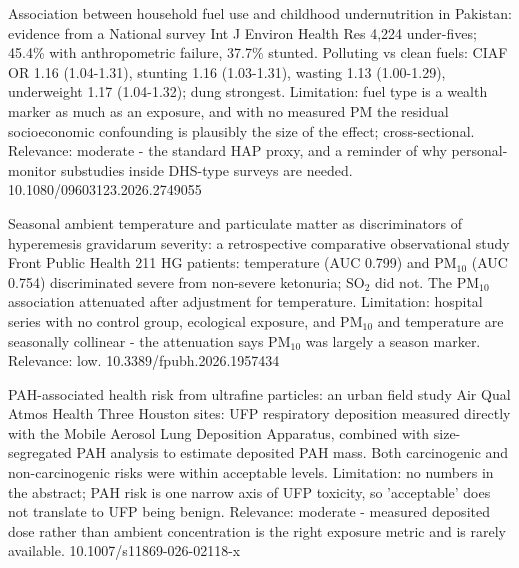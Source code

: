 \documentclass[10pt]{article}
\begin{document}
\par{}\baselineskip{}\baselineskip
{}

{Association between household fuel use and childhood undernutrition in Pakistan: evidence from a National survey}
{Int J Environ Health Res}
{4,224 under-fives; 45.4\% with anthropometric failure, 37.7\% stunted. Polluting vs clean fuels: CIAF OR 1.16 (1.04-1.31), stunting 1.16 (1.03-1.31), wasting 1.13 (1.00-1.29), underweight 1.17 (1.04-1.32); dung strongest. Limitation: fuel type is a wealth marker as much as an exposure, and with no measured PM the residual socioeconomic confounding is plausibly the size of the effect; cross-sectional. Relevance: moderate - the standard HAP proxy, and a reminder of why personal-monitor substudies inside DHS-type surveys are needed.}
{10.1080/09603123.2026.2749055}

{Seasonal ambient temperature and particulate matter as discriminators of hyperemesis gravidarum severity: a retrospective comparative observational study}
{Front Public Health}
{211 HG patients: temperature (AUC 0.799) and PM$_{10}$ (AUC 0.754) discriminated severe from non-severe ketonuria; SO$_2$ did not. The PM$_{10}$ association attenuated after adjustment for temperature. Limitation: hospital series with no control group, ecological exposure, and PM$_{10}$ and temperature are seasonally collinear - the attenuation says PM$_{10}$ was largely a season marker. Relevance: low.}
{10.3389/fpubh.2026.1957434}

\par{}\baselineskip{}\baselineskip
{}

{PAH-associated health risk from ultrafine particles: an urban field study}
{Air Qual Atmos Health}
{Three Houston sites: UFP respiratory deposition measured directly with the Mobile Aerosol Lung Deposition Apparatus, combined with size-segregated PAH analysis to estimate deposited PAH mass. Both carcinogenic and non-carcinogenic risks were within acceptable levels. Limitation: no numbers in the abstract; PAH risk is one narrow axis of UFP toxicity, so 'acceptable' does not translate to UFP being benign. Relevance: moderate - measured deposited dose rather than ambient concentration is the right exposure metric and is rarely available.}
{10.1007/s11869-026-02118-x}
\end{document}
